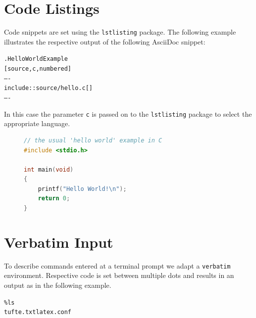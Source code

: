 \documentclass[10pt,a4paper,oneside,BCOR5mm]{scrartcl}
\begin{document}
\section{Code Listings}
\label{_code_listings}
 \par\noindent{}Code snippets are set using the \texttt{lstlisting} package. The following example illustrates the respective output of the following AsciiDoc snippet:
\begin{alltt}.Hello World Example
[source,c,numbered]
----
include::source/hello.c[]
----\end{alltt}
 \par\noindent{}In this case the parameter \texttt{c} is passed on to the \texttt{lstlisting} package to select the appropriate language.
\begin{figure}[!hptb]
\begin{lstlisting}[caption=Hello World Example,language=c,frame=L]
// the usual 'hello world' example in C
#include <stdio.h>

int main(void)
{
    printf("Hello World!\n");
    return 0;
}\end{lstlisting}
\end{figure}
\hypertarget{_verbatim_input}{}
\section{Verbatim Input}
\label{_verbatim_input}
 \par\noindent{}To describe commands entered at a terminal prompt we adapt a \texttt{verbatim} environment. Respective code is set between multiple dots and results in an output as in the following example.
\begin{alltt}\%{} ls
tufte.txt latex.conf\end{alltt}
\hypertarget{_tables}{}
\end{document}
